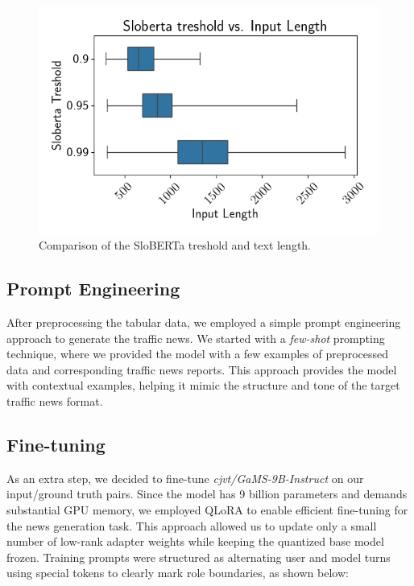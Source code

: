 \documentclass[fleqn,moreauthors,10pt]{ds_report}
\begin{document}
\begin{figure}[h]
    \centering
    \includegraphics[width=0.8\linewidth]{fig/treshold_vs_len.png}
    \caption{Comparison of the SloBERTa treshold and text length.}
    \label{fig:preprocessing}
\end{figure}





\subsection*{Prompt Engineering}

After preprocessing the tabular data, we employed a simple prompt engineering approach to generate the traffic news.
We started with a \textit{few-shot} prompting \cite{promptingguide_fewshot} technique, where we provided the model
with a few examples of preprocessed data and corresponding traffic news reports. This approach provides the model
with contextual examples, helping it mimic the structure and tone of the target traffic news format.

\subsection*{Fine-tuning}

As an extra step, we decided to fine-tune \textit{cjvt/GaMS-9B-Instruct} on our input/ground truth pairs. Since the model has 9 billion parameters and demands substantial GPU memory, we employed QLoRA to enable efficient fine-tuning for the news generation task. This approach allowed us to update only a small number of low-rank adapter weights while keeping the quantized base model frozen. Training prompts were structured as alternating user and model turns using special tokens to clearly mark role boundaries, as shown below:
\end{document}
